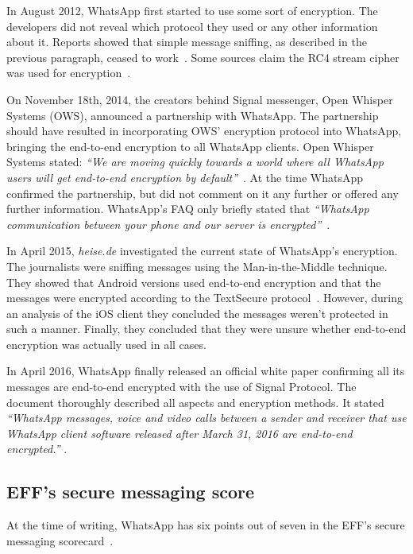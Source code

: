 \documentclass[thesis=M,english]{FITthesis}[2012/10/20]
\begin{document}
In August 2012, WhatsApp first started to use some sort of encryption. The developers did not reveal which protocol they used or any other information about it. Reports showed that simple message sniffing, as described in the previous paragraph, ceased to work~\cite{whatsapp-sniffernomore}. Some sources claim the  RC4 stream cipher was used for encryption~\cite{whatsapp-rc4,whatsapp-rc42}.

On November 18th, 2014, the creators behind Signal messenger, Open Whisper Systems (OWS), announced a partnership with WhatsApp. The partnership should have resulted in incorporating OWS' encryption protocol into WhatsApp, bringing the end-to-end encryption to all WhatsApp clients. Open Whisper Systems stated: \emph{``We are moving quickly towards a world where all WhatsApp users will get end-to-end encryption by default''}~\cite{openwhisperwhatsapp}. At the time WhatsApp confirmed the partnership, but did not comment on it any further or offered any further information. WhatsApp's FAQ only briefly stated that \emph{``WhatsApp communication between your phone and our server is encrypted''}~\cite{whatsapp-faq}.

In April 2015, \emph{heise.de} investigated the current state of WhatsApp's encryption. The journalists were sniffing messages using the Man-in-the-Middle technique. They showed that Android versions used end-to-end encryption and that the messages were encrypted according to the TextSecure protocol~\cite{whatsapp-encstate}. However, during an analysis of the iOS client they concluded the messages weren't protected in such a manner. Finally, they concluded that they were unsure whether end-to-end encryption was actually used in all cases.

In April 2016, WhatsApp finally released an official white paper confirming all its messages are end-to-end encrypted with the use of Signal Protocol. The document thoroughly described all aspects and encryption methods. It stated \emph{``WhatsApp messages, voice and video calls between a sender and receiver that use WhatsApp client software released after March 31, 2016 are end-to-end encrypted.''} \cite{whatsapp-whitepaper}.


\subsection{EFF's secure messaging score}

At the time of writing, WhatsApp has six points out of seven in the EFF's secure messaging scorecard~\cite{eff-score}.
\end{document}
